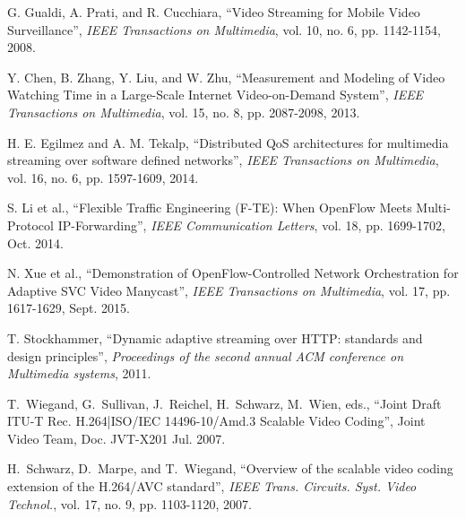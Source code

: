 \documentclass[journal]{IEEEtran}
\begin{document}

%
%
%
\begin{thebibliography}{1}

G. Gualdi, A. Prati, and R. Cucchiara, ``Video Streaming for Mobile Video Surveillance'', {\em IEEE Transactions on Multimedia}, vol. 10, no. 6, pp. 1142-1154, 2008.

Y. Chen, B. Zhang, Y. Liu, and W. Zhu, ``Measurement and Modeling of Video Watching Time in a Large-Scale Internet Video-on-Demand System'', {\em IEEE Transactions on Multimedia}, vol. 15, no. 8, pp. 2087-2098, 2013.

H. E. Egilmez and A. M. Tekalp, ``Distributed QoS architectures for multimedia streaming over software defined networks'', {\em IEEE Transactions on Multimedia}, vol. 16, no. 6, pp. 1597-1609, 2014.

S. Li et al., ``Flexible Traffic Engineering (F-TE): When OpenFlow Meets Multi-Protocol IP-Forwarding'', {\em IEEE Communication Letters}, vol. 18, pp. 1699-1702, Oct. 2014.

N. Xue et al., ``Demonstration of OpenFlow-Controlled Network Orchestration for Adaptive SVC Video Manycast'', {\em IEEE Transactions on Multimedia}, vol. 17, pp. 1617-1629, Sept. 2015.

T. Stockhammer, ``Dynamic adaptive streaming over HTTP: standards and design principles'', {\em Proceedings of the second annual ACM conference on Multimedia systems}, 2011.

T.~Wiegand, G.~Sullivan, J.~Reichel, H.~Schwarz, M.~Wien, eds., ``Joint Draft ITU-T Rec. H.264|ISO/IEC 14496-10/Amd.3 Scalable Video Coding'', Joint Video Team, Doc. JVT-X201 Jul. 2007.

H.~Schwarz, D.~Marpe, and T.~Wiegand, ``Overview of the scalable video coding extension of the H.264/AVC standard'', {\em IEEE Trans. Circuits. Syst. Video Technol.}, vol. 17, no. 9, pp. 1103-1120, 2007.


\end{thebibliography}
\end{document}
